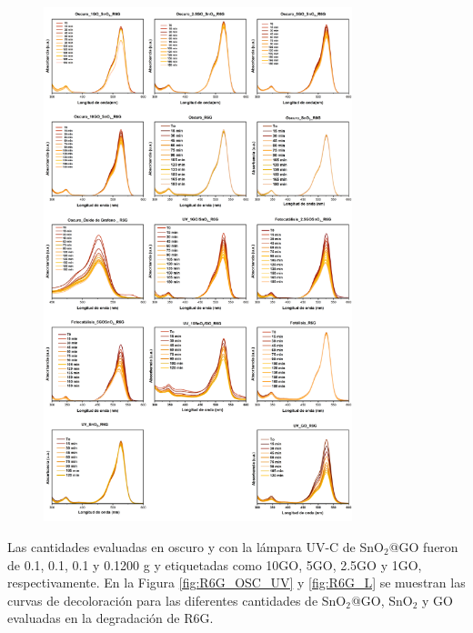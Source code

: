 \documentclass[12pt]{article}
\begin{document}
\begin{figure}[H]
    	   \begin{center}
     	  	\includegraphics[width = 0.8\textwidth]{Imagenes/R6G/R6G_Fotocatalisis.png}
    	   \end{center} 
        \end{figure}

Las cantidades evaluadas en oscuro y con la lámpara UV-C de SnO$\displaystyle _{2}$@GO fueron de 0.1, 0.1, 0.1 y 0.1200 g  y etiquetadas como 10GO, 5GO, 2.5GO y 1GO, respectivamente.  En la Figura \ref{fig:R6G_OSC_UV} y \ref{fig:R6G_L} se muestran las curvas de decoloración para las diferentes cantidades de SnO$\displaystyle _{2}$@GO, SnO$\displaystyle _{2}$ y GO evaluadas en la degradación de R6G. \vspace{1em} %
\end{document}
